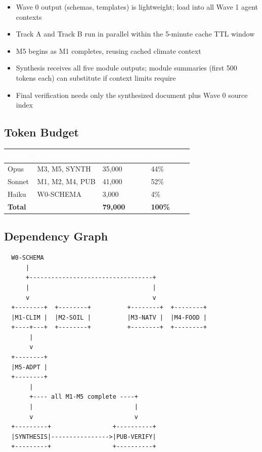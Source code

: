 \documentclass[11pt,letterpaper]{article}
\newcommand{\tableheader}[1]{\textbf{\sffamily\textcolor{white}{#1}}}
\begin{document}
\begin{itemize}[leftmargin=2em]
  \item Wave 0 output (schemas, templates) is lightweight; load into all Wave 1 agent contexts
  \item Track A and Track B run in parallel within the 5-minute cache TTL window
  \item M5 begins as M1 completes, reusing cached climate context
  \item Synthesis receives all five module outputs; module summaries (first 500 tokens each) can substitute if context limits require
  \item Final verification needs only the synthesized document plus Wave 0 source index
\end{itemize}

\subsection{Token Budget}

\begin{center}
\begin{tabularx}{\textwidth}{L{3cm}C{2cm}C{2cm}C{2cm}}
\toprule
{}
\tableheader{Model} & \tableheader{Components} & \tableheader{Est. Tokens} & \tableheader{Budget \%} \\
\midrule
Opus & M3, M5, SYNTH & 35,000 & 44\% \\
Sonnet & M1, M2, M4, PUB & 41,000 & 52\% \\
Haiku & W0-SCHEMA & 3,000 & 4\% \\
\midrule
\textbf{Total} & & \textbf{79,000} & \textbf{100\%} \\
\bottomrule
\end{tabularx}
\end{center}

\subsection{Dependency Graph}

\begin{asciibox}
\begin{verbatim}
  W0-SCHEMA
      |
      +----------------------------------+
      |                                  |
      v                                  v
  +--------+  +--------+          +--------+  +--------+
  |M1-CLIM |  |M2-SOIL |          |M3-NATV |  |M4-FOOD |
  +----+---+  +--------+          +--------+  +--------+
       |
       v
  +--------+
  |M5-ADPT |
  +--------+
       |
       +---- all M1-M5 complete ----+
       |                            |
       v                            v
  +---------+                 +----------+
  |SYNTHESIS|---------------->|PUB-VERIFY|
  +---------+                 +----------+
\end{verbatim}
\end{asciibox}
\end{document}
